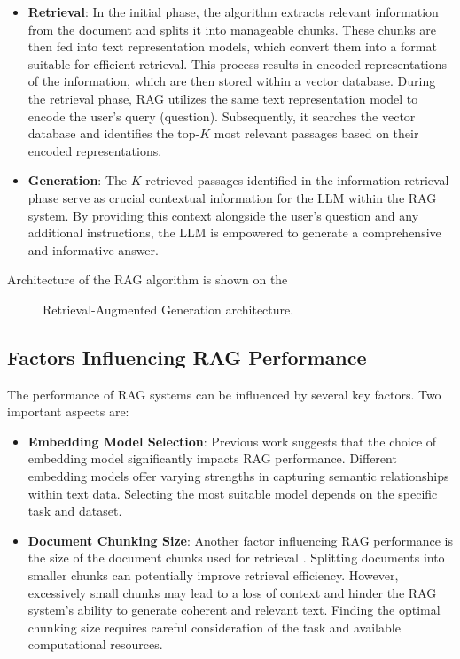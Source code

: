 \begin{itemize}
  \item \textbf{Retrieval}:
    In the initial phase, the algorithm extracts relevant information from the document and splits it into manageable chunks.
    These chunks are then fed into text representation models, which convert them into a format suitable for efficient retrieval.
    This process results in encoded representations of the information, which are then stored within a vector database.
    During the retrieval phase, \ac{RAG} utilizes the same text representation model to encode the user's query (question).
    Subsequently, it searches the vector database and identifies the top-$K$ most relevant passages based on their encoded representations.
  \item \textbf{Generation}:
    The $K$ retrieved passages identified in the information retrieval phase serve as crucial contextual information for the \ac{LLM} within the \ac{RAG} system.
    By providing this context alongside the user's question and any additional instructions, the \ac{LLM} is empowered to generate a comprehensive and informative answer.
\end{itemize}

Architecture of the \ac{RAG} algorithm is shown on the 

\begin{figure}[h]
  \centering
  
  \caption{Retrieval-Augmented Generation architecture.}
  \label{fig:RAG_scheme}
\end{figure}

\subsection{Factors Influencing \ac{RAG} Performance}
The performance of \ac{RAG} systems can be influenced by several key factors.
Two important aspects are:

\begin{itemize}
    \item \textbf{Embedding Model Selection}:
        Previous work \cite{joshi2024RAGemb} suggests that the choice of embedding model significantly impacts \ac{RAG} performance.
        Different embedding models offer varying strengths in capturing semantic relationships within text data.
        Selecting the most suitable model depends on the specific task and dataset.
    \item \textbf{Document Chunking Size}:
        Another factor influencing \ac{RAG} performance is the size of the document chunks used for retrieval \cite{theja2023RAGchunk}.
        Splitting documents into smaller chunks can potentially improve retrieval efficiency.
        However, excessively small chunks may lead to a loss of context and hinder the \ac{RAG} system's ability to generate coherent and relevant text.
        Finding the optimal chunking size requires careful consideration of the task and available computational resources.    
\end{itemize}





